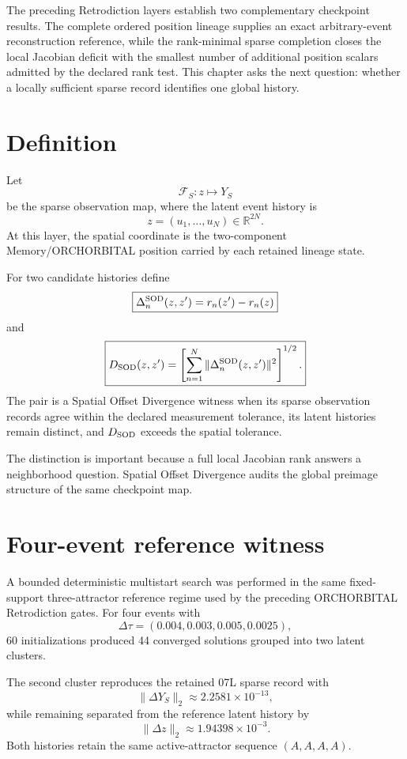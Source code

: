 \documentclass[11pt]{book}
\begin{document}
The preceding Retrodiction layers establish two complementary checkpoint results. The complete ordered position lineage supplies an exact arbitrary-event reconstruction reference, while the rank-minimal sparse completion closes the local Jacobian deficit with the smallest number of additional position scalars admitted by the declared rank test. This chapter asks the next question: whether a locally sufficient sparse record identifies one global history.

\section{Definition}

Let
\[
\mathcal F_S:z\mapsto Y_S
\]
be the sparse observation map, where the latent event history is
\[
z=(u_1,\ldots,u_N)\in\mathbb R^{2N}.
\]
At this layer, the spatial coordinate is the two-component Memory/ORCHORBITAL position carried by each retained lineage state.

For two candidate histories define
\[
\boxed{
\Delta_n^{\rm SOD}(z,z')=r_n(z')-r_n(z)
}
\]
and
\[
\boxed{
D_{\rm SOD}(z,z')
=
\left[
\sum_{n=1}^{N}
\|\Delta_n^{\rm SOD}(z,z')\|^2
\right]^{1/2}.
}
\]
The pair is a Spatial Offset Divergence witness when its sparse observation records agree within the declared measurement tolerance, its latent histories remain distinct, and $D_{\rm SOD}$ exceeds the spatial tolerance.

The distinction is important because a full local Jacobian rank answers a neighborhood question. Spatial Offset Divergence audits the global preimage structure of the same checkpoint map.

\section{Four-event reference witness}

A bounded deterministic multistart search was performed in the same fixed-support three-attractor reference regime used by the preceding ORCHORBITAL Retrodiction gates. For four events with
\[
\Delta\tau=(0.004,0.003,0.005,0.0025),
\]
60 initializations produced 44 converged solutions grouped into two latent clusters.

The second cluster reproduces the retained 07L sparse record with
\[
\|\Delta Y_S\|_2
\approx2.2581\times10^{-13},
\]
while remaining separated from the reference latent history by
\[
\|\Delta z\|_2
\approx1.94398\times10^{-3}.
\]
Both histories retain the same active-attractor sequence $(A,A,A,A)$.
\end{document}
